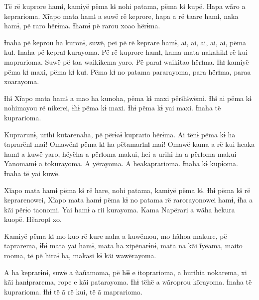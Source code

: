 Të rë kuprore hamɨ, kamiyë pëma kɨ nohi patama, pëma kɨ kupë. Hapa wãro
a keprarioma. Xĩapo mata hamɨ a suwë rë keprore, hapa a rë taare hamɨ,
naka hamɨ, pë raro hërɨma. Ɨhamɨ pë rarou xoao hërɨma. 

Ɨnaha pë keprou ha kuronɨ, suwë, pei pë rë keprare hamɨ, ai, ai, ai, ai,
ai, pëma kuɨ. Ɨnaha pë kepraɨ kurayoma. Pë rë kuprore hamɨ, kama mata
nakahikɨ rë kui maprarioma. Suwë pë taa waikikema yaro. Pë paraɨ
waikitao hërɨma. Ɨhɨ kamiyë pëma kɨ maxi, pëma kɨ kuɨ. Pëma kɨ no patama
pararayoma, para hërɨma, paraa xoarayoma. 

Ɨhɨ Xĩapo mata hamɨ a mao ha kunoha, pëma kɨ maxi përɨhɨwëmi. Ɨhɨ ai
pëma kɨ nohimayou rë nikerei, ɨ̃hɨ pëma kɨ maxi. Ɨhɨ pëma kɨ yai maxi.
Ɨnaha të kuprarioma. 

Kuprarunɨ, urihi kutarenaha, pë përɨaɨ kuprario hërɨma. Ai tënɨ pëma kɨ
ha taprarënɨ mai! Omawënɨ pëma kɨ ha pëtamarɨnɨ mai! Omawë kama a rë kui
heaka hamɨ a kuwë yaro, hëyëha a përɨoma makui, hei a urihi ha a përɨoma
makui Yanomamɨ a tokurayoma. A yërayoma. A heakaprarioma. Ɨnaha kɨ
kupɨoma. Ɨnaha të yai kuwë. 

Xĩapo mata hamɨ pëma kɨ rë hare, nohi patama, kamiyë pëma kɨ. Ɨhɨ pëma
kɨ rë keprarenowei, Xĩapo mata hamɨ pëma kɨ no patama rë rarorayonowei
hamɨ, ɨ̃ha a kãi përɨo taonomi. Yai hamɨ a rii kurayoma. Kama Napërari a
wãha hekura kuopë. Hẽaropɨ xo. 

Kamiyë pëma kɨ mo kuo rë kure naha a kuwëmou, mo hãhoa makure, pë
taprarema, ɨ̃hɨ mata yai hamɨ, mata ha xipënarɨnɨ, mata na kãi ĩyëama,
maito rooma, të pë hiraɨ ha, makasi kɨ kãi wawërayoma. 

A ha keprarɨnɨ, suwë a ũaũamoma, pë hɨɨ e itoprarioma, a hurihia
nokarema, xi kãi hanɨprarema, rope e kãi patarayoma. Ɨhɨ tëhë a wãroprou
kõrayoma. Ɨnaha të kuprarioma. Ɨhɨ të ã rë kui, të ã maprarioma. 
